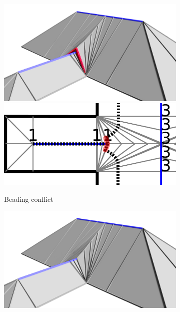 \begin{figure}\centering
\setlength{\figheight}{.2\columnwidth}
\begin{subfigure}{.45\columnwidth}\centering
\includegraphics[width=.95\columnwidth,frame]{sources-method-beading-conflict-3D.png}
\includegraphics[height=\figheight]{sources-method-beading-conflict.pdf}
\caption{Beading conflict}\label{beading_conflict}
\end{subfigure}
\begin{subfigure}{.45\columnwidth}\centering
\includegraphics[width=.95\columnwidth,frame]{sources-method-beading-conflict-solved-3D.png}

\end{subfigure}
\end{figure}
